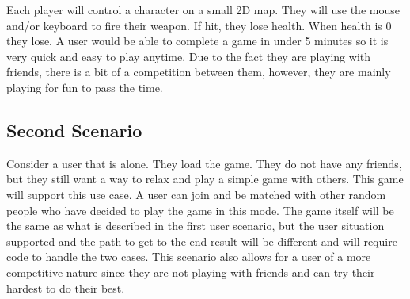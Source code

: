 \documentclass[11pt, oneside]{article}   	%
\begin{document}
Each player will control a character on a small 2D map. They will use the mouse and/or keyboard to fire their weapon. If hit, they lose health. When health is 0 they lose. A user would be able to complete a game in under 5 minutes so it is very quick and easy to play anytime. Due to the fact they are playing with friends, there is a bit of a competition between them, however, they are mainly playing for fun to pass the time. \\

\subsection{Second Scenario}
Consider a user that is alone. They load the game. They do not have any friends, but they still want a way to relax and play a simple game with others. This game will support this use case. A user can join and be matched with other random people who have decided to play the game in this mode. The game itself will be the same as what is described in the first user scenario, but the user situation supported and the path to get to the end result will be different and will require code to handle the two cases. This scenario also allows for a user of a more competitive nature since they are not playing with friends and can try their hardest to do their best. 
\end{document}
